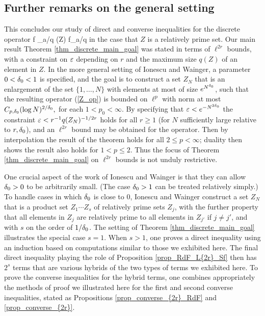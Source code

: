 \documentclass[oneside,11pt]{amsart}
\newcommand{\Rcal}{\mathcal{R}}
\begin{document}
 \subsection{Further remarks on the general setting}\label{sec_gen}
This concludes  our study of direct and converse inequalities for the discrete operator 
  \beq\label{Z_op}
   f \mapsto \sum_{a/q \in \Rcal(Z)} f_{a/q}
   \eeq
   in the case that $Z$ is a relatively prime set.
Our main result Theorem \ref{thm_discrete_main_goal}  was stated in terms of $\ell^{2r}$ bounds, with a constraint on $\varepsilon$ depending on $r$ and the maximum size $q(Z)$ of an element in $Z$.    In the more general setting of Ionescu and Wainger, a parameter $0<\delta_0<1$ is specified, and the goal is to construct a set $Z_N$  that is an enlargement of the set $\{1,\ldots, N\}$ with elements at most of size $e^{N^{\delta_0}}$, such that the resulting operator (\ref{Z_op}) is bounded on $\ell^p$ with norm at most $C_{p,\delta_0}(\log N)^{2/\delta_0},$ for each $1<p_0< \infty$. By specifying that $\varepsilon< e^{-N^{2\delta_0}}$ the constraint $\varepsilon< r^{-1}q(Z_N)^{-1/2r}$ holds for all $r \geq 1$ (for $N$ sufficiently large relative to $r,\delta_0$), and an $\ell^{2r}$ bound may be obtained for the operator. Then by interpolation the result of the theorem holds for all $2 \leq p  <\infty$; duality then shows the result also holds for $1 < p  \leq 2$. Thus the focus of Theorem \ref{thm_discrete_main_goal} on $\ell^{2r}$ bounds is not unduly restrictive.

One crucial aspect of the work of Ionescu and Wainger is that they can allow $\delta_0 >0 $ to be arbitrarily small. (The case $\delta_0 >1$ can be treated relatively simply.) To handle cases in which $\delta_0$ is close to 0, Ionescu and Wainger construct a set   $Z_N$ that is a product set $Z_1 \cdots Z_s$ of relatively prime sets $Z_j$,   with the further property that all elements in $Z_j$ are relatively prime to all elements in $Z_{j'}$ if $j \neq j'$, and with $s$ on the order of $1/\delta_0$. The setting of Theorem \ref{thm_discrete_main_goal} illustrates the special case $s=1$. When $s>1$, one  proves a direct inequality using an induction based on computations similar to those we exhibited here. The final direct inequality playing the role of Proposition \ref{prop_RdF_L{2r}_Sf} then   has $2^s$ terms that are various hybrids  of the two types of  terms we exhibited here. 
To prove the converse inequalities for the hybrid terms, one combines appropriately the methods of proof we illustrated here for the first and second converse inequalities, stated as Propositions \ref{prop_converse_{2r}_RdF} and \ref{prop_converse_{2r}}. 
 
\end{document}
